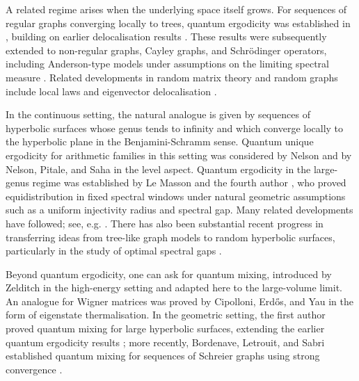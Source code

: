 \documentclass[11pt,twoside,reqno]{amsart}
\newcommand{\1}{\mathrm{\mathbf{1}}}
\numberwithin{equation}{section}
\theoremstyle{plain}
\theoremstyle{definition}
\theoremstyle{remark}
\begin{document}
A related regime arises when the underlying space itself grows. For sequences of regular graphs converging locally to trees, quantum ergodicity was established in \cite{anantharamanQuantumErgodicityLarge2015,brooks2015quantumergodicityaveragingoperators}, building on earlier delocalisation results \cite{brooksNonlocalizationEigenfunctionsLarge2013}. These results were subsequently extended to non-regular graphs, Cayley graphs, and Schr\"odinger operators, including Anderson-type models under assumptions on the limiting spectral measure \cite{AnantharamanSabriAnnals,anantharamanQuantumErgodicityAnderson2017,AnantharamanSabri2019,MageeThomasZhao2023,bordenave2026quantummixinglargeschreier}. Related developments in random matrix theory and random graphs include local laws and eigenvector delocalisation \cite{erdosLocalSemicircleLaw2009,erdosSpectralStatisticsErdosRenyi2013,bauerschmidtLocalSemicircleLaw2017,bauerschmidtLocalKestenMcKay2019}.

In the continuous setting, the natural analogue is given by sequences of hyperbolic surfaces whose genus tends to infinity and which converge locally to the hyperbolic plane in the Benjamini-Schramm sense. Quantum unique ergodicity for arithmetic families in this setting was considered by Nelson \cite{Nelson_2011} and by Nelson, Pitale, and Saha \cite{NelsonPitaleSaha} in the level aspect. Quantum ergodicity in the large-genus regime was established by Le Masson and the fourth author \cite{lemassonQuantumErgodicityBenjaminiSchramm2017}, who proved equidistribution in fixed spectral windows under natural geometric assumptions such as a uniform injectivity radius and spectral gap. Many related developments have followed; see, e.g. \cite{lemassonQuantumErgodicityEisenstein2024,abertEigenfunctionsRandomWaves2018,AnantharamanSaha,peterson2023quantumergodicitybruhattitsbuilding,brumley2020quantumergodicitycompactquotients,brumley2026quantumergodicitybenjaminischrammlimit,monkGeometrySpectrumTypical,monkBenjaminiSchrammConvergence2022,gilmoreShortGeodesicLoops2021,KimTao2026,Gavelli2026}. There has also been substantial recent progress in transferring ideas from tree-like graph models to random hyperbolic surfaces, particularly in the study of optimal spectral gaps \cite{AnantharamanMonk2023,AnantharamanMonk2024a,AnantharamanMonk2024b,AnantharamanMonk2025,HideMaceraThomas2025a,HideMaceraThomas2025b,MageePuderVanHandel2025,HideMagee,BordenaveCollins,Chen_2026,KimTao2026}.

Beyond quantum ergodicity, one can ask for quantum mixing, introduced by Zelditch \cite{Zel90,Zel96a} in the high-energy setting and adapted here to the large-volume limit. An analogue for Wigner matrices was proved by Cipolloni, Erd\H{o}s, and Yau \cite{CES21} in the form of eigenstate thermalisation. In the geometric setting, the first author proved quantum mixing for large hyperbolic surfaces, extending the earlier quantum ergodicity results \cite{lemassonQuantumErgodicityBenjaminiSchramm2017,lemassonQuantumErgodicityEisenstein2024}; more recently, Bordenave, Letrouit, and Sabri established quantum mixing for sequences of Schreier graphs \cite{bordenave2026quantummixinglargeschreier} using strong convergence \cite{BordenaveCollins}.
\end{document}
